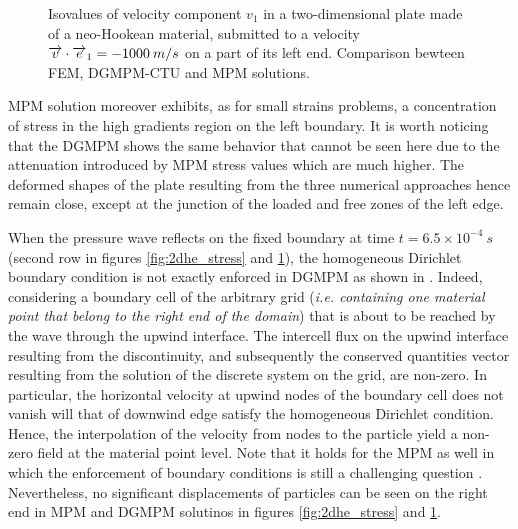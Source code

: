 \begin{figure}[h!]
  \centering
  
  \caption{Isovalues of velocity component $v_1$ in a two-dimensional plate made of a neo-Hookean material, submitted to a velocity ${\overrightarrow{v}}\cdot{\overrightarrow{e}}_1=-1000 \: m/s$ on a part of its left end. Comparison bewteen FEM, DGMPM-CTU and MPM solutions.}
  \label{fig:2dhe_velo}
\end{figure}
MPM solution moreover exhibits, as for small strains problems, a concentration of stress in the high gradients region on the left boundary. It is worth noticing that the DGMPM shows the same behavior that cannot be seen here due to the attenuation introduced by MPM stress values which are much higher.
The deformed shapes of the plate resulting from the three numerical approaches hence remain close, except at the junction of the loaded and free zones of the left edge.

When the pressure wave reflects on the fixed boundary at time $t=6.5\times 10^{-4}\:s$ (second row in figures \ref{fig:2dhe_stress} and \ref{fig:2dhe_velo}), the homogeneous Dirichlet boundary condition is not exactly enforced in DGMPM as shown in \cite{DGMPM}.
Indeed, considering a boundary cell of the arbitrary grid (\textit{i.e. containing one material point that belong to the right end of the domain}) that is about to be reached by the wave through the upwind interface.
The intercell flux on the upwind interface resulting from the discontinuity, and subsequently the conserved quantities vector resulting from the solution of the discrete system on the grid, are non-zero.
In particular, the horizontal velocity at upwind nodes of the boundary cell does not vanish will that of downwind edge satisfy the homogeneous Dirichlet condition. 
Hence, the interpolation of the velocity from nodes to the particle yield a non-zero field at the material point level.
Note that it holds for the MPM as well in which the enforcement of boundary conditions is still a challenging question \cite{BC_MPM}.
Nevertheless, no significant displacements of particles can be seen on the right end in MPM and DGMPM solutinos in figures \ref{fig:2dhe_stress} and \ref{fig:2dhe_velo}.

